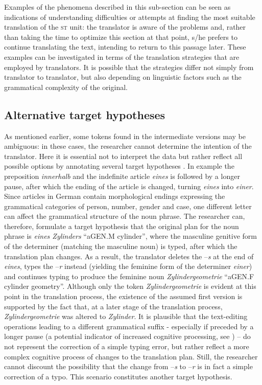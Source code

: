\documentclass[output=paper]{LSP/langsci}
\begin{document}
Examples of the phenomena described in this sub-section can be seen as indications of understanding difficulties or attempts at finding the most suitable translation of the \textsc{st} unit: the translator is aware of the problems and, rather than taking the time to optimize this section at that point, s/he prefers to continue translating the text, intending to return to this passage later. These examples can be investigated in terms of the translation strategies that are employed by translators. It is possible that the strategies differ not simply from translator to translator, but also depending on linguistic factors such as the grammatical complexity of the original.

\subsection{Alternative target hypotheses} \label{sec:1:3:2}
As mentioned earlier, some tokens found in the intermediate versions may be ambiguous: in these cases, the researcher cannot determine the intention of the translator. Here it is essential not to interpret the data but rather reflect all possible options by annotating several target hypotheses \citep{Lüdeling2008}. In example  the preposition \textit{innerhalb} and the indefinite article \textit{eines} is followed by a longer pause, after which the ending of the article is changed, turning \textit{eines} into \textit{einer}. Since articles in German contain morphological endings expressing the grammatical categories of person, number, gender and case, one different letter can affect the grammatical structure of the noun phrase. The researcher can, therefore, formulate a target hypothesis that the original plan for the noun phrase is \textit{eines Zylinders} “a{\tiny GEN.M} cylinder”, where the masculine genitive form of the determiner (matching the masculine noun) is typed, after which the translation plan changes. As a result, the translator deletes the –\textit{s} at the end of \textit{eines}, types the –\textit{r} instead (yielding the feminine form of the determiner \textit{einer}) and continues typing to produce the feminine noun \textit{Zylindergeometrie} “a{\tiny GEN.F} cylinder geometry”. Although only the token \textit{Zylindergeometrie} is evident at this point in the translation process, the existence of the assumed first version is supported by the fact that, at a later stage of the translation process, \textit{Zylindergeometrie} was altered to \textit{Zylinder}. It is plausible that the text-editing operations leading to a different grammatical suffix - especially if preceded by a longer pause (a potential indicator of increased cognitive processing, see \citealt{Dragsted2005}) – do not represent the correction of a simple typing error, but rather reflect a more complex cognitive process of changes to the translation plan. Still, the researcher cannot discount the possibility that the change from –\textit{s} to –\textit{r} is in fact a simple correction of a typo. This scenario constitutes another target hypothesis.
\end{document}
